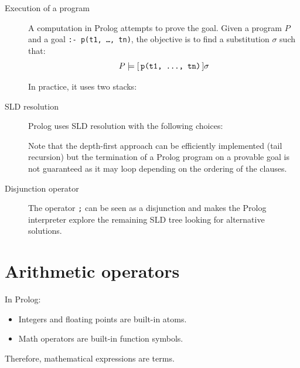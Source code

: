 \begin{description}
    \item[Execution of a program]
        A computation in Prolog attempts to prove the goal.
        Given a program $P$ and a goal \texttt{:- p(t1, \dots, tn)},
        the objective is to find a substitution $\sigma$ such that:
        \[ P \models [\, \texttt{p(t1, \dots, tn)} \,]\sigma \]

        In practice, it uses two stacks:

    \item[SLD resolution] 
        Prolog uses SLD resolution with the following choices:

        Note that the depth-first approach can be efficiently implemented (tail recursion)
        but the termination of a Prolog program on a provable goal is not guaranteed as it may loop depending on the ordering of the clauses.

    \item[Disjunction operator]
        The operator \texttt{;} can be seen as a disjunction and makes the Prolog interpreter
        explore the remaining SLD tree looking for alternative solutions.
\end{description}



\section{Arithmetic operators}

In Prolog:
\begin{itemize}
    \item Integers and floating points are built-in atoms.
    \item Math operators are built-in function symbols.
\end{itemize}
Therefore, mathematical expressions are terms.


